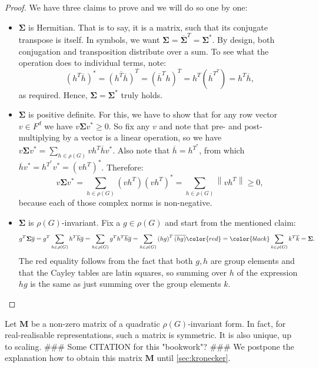 \documentclass[11pt]{article}
\begin{document}
\begin{proof}
  We have three claims to prove and we will do so one by one:
  \begin{itemize}
    \item $\mathbf{\Sigma}$ is Hermitian. That is to say, it is a matrix, such that its conjugate
    transpose is itself. In symbols, we want $\mathbf{\Sigma} = \overline{\mathbf{\Sigma}}^T = \mathbf{\Sigma}^*$.
    By design, both conjugation and transposition distribute over a sum. To see what the operation
    does to individual terms, note:
    \[\left(h^T\overline{h}\right)^* = \overline{\left(h^T\overline{h}\right)}^T =
    \left(\overline{h}^Th\right)^T = h^T\left(\overline{h}^{T^T}\right) = h^T\overline{h},\]
    as required. Hence, $\mathbf{\Sigma} = \mathbf{\Sigma}^*$ truly holds.
    \item $\mathbf{\Sigma}$ is positive definite. For this, we have to show that for any row vector $v \in F^d$
    we have $v\mathbf{\Sigma}v^* \geq 0$. So fix any $v$ and note that pre- and post-multiplying by
    a vector is a linear operation, so we have $v\mathbf{\Sigma}v^* = \sum_{h \in \rho(G)} vh^T\overline{h}v^*$.
    Also note that $\overline{h} = h^{T^*}$, from which $\overline{h}v^* = h^{T^*}v^* = \left(vh^T\right)^*$. Therefore:
    \[v\mathbf{\Sigma}v^* = \sum_{h \in \rho(G)} \left(vh^T\right)\left(vh^T\right)^* = \sum_{h \in \rho(G)} \left\lVert vh^T\right\rVert \geq 0,\]
    because each of those complex norms is non-negative.
    \item $\mathbf{\Sigma}$ is $\rho(G)$-invariant. Fix a $g \in \rho(G)$ and start from the mentioned claim:
    \[g^T\mathbf{\Sigma}\overline{g} = g^T\sum_{h \in \rho(G)}h^T\overline{h} \overline{g} = \sum_{h \in \rho(G)}g^Th^T\overline{h} \overline{g}=
    \sum_{h \in \rho(G)} \left(hg\right)^T \overline{(hg)} \color{red}=\color{black} \sum_{k \in \rho(G)} k^T \overline{k} = \mathbf{\Sigma}.\]
    The red equality follows from the fact that both $g,h$ are group elements and that the Cayley tables are latin squares, so
    summing over $h$ of the expression $hg$ is the same as just summing over the group elements $k$.
  \end{itemize}
\end{proof}

Let $\mathbf{M}$ be a non-zero matrix of a quadratic $\rho(G)$-invariant form.
In fact, for real-realisable representations, such a matrix is symmetric. It is
also unique, up to scaling. \#\#\# Some CITATION for this "bookwork"? \#\#\#
We postpone the explanation how to obtain this matrix $\mathbf{M}$ until
\cref{sec:kronecker}.
\end{document}
